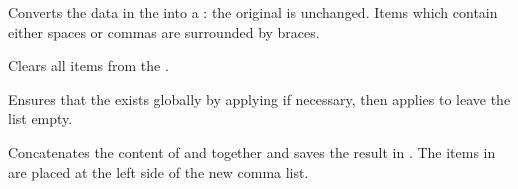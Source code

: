 \documentclass[oneside]{book}
\begin{document}
\begin{function}{\clistSetFromSeq}
\begin{syntax}
  
\end{syntax}
Converts the data in the  into a :
the original  is unchanged.
Items which contain either spaces or commas are surrounded by braces.
\begin{demohigh}
\seqPutRight {}
\seqPutRight {}
\clistSetFromSeq \lTmpaClist \lTmpaSeq
\clistVarJoin {}
\end{demohigh}
\end{function}

\begin{function}{\clistClear}
\begin{syntax}
 
\end{syntax}
Clears all items from the .
\begin{codehigh}
\clistSet {}
\clistClear \lTmpaClist
\end{codehigh}
\end{function}

\begin{function}{\clistClearNew}
\begin{syntax}
 
\end{syntax}
Ensures that the  exists globally by applying
 if necessary, then applies  to leave
the list empty.
\begin{demohigh}
\clistClearNew \lFooSomeClist
\clistSet {}
\clistVarJoin {}
\end{demohigh}
\end{function}

\begin{function}{\clistConcat}
\begin{syntax}
   
\end{syntax}
Concatenates the content of  and 
together and saves the result in . The items in
 are placed at the left side of the new comma list.
\begin{demohigh}
\clistSet {}
\clistSet {}
\clistConcat \lTmpaClist \lTmpbClist \lTmpcClist
\clistVarJoin \lTmpaClist { + }
\end{demohigh}
\end{function}
\end{document}
